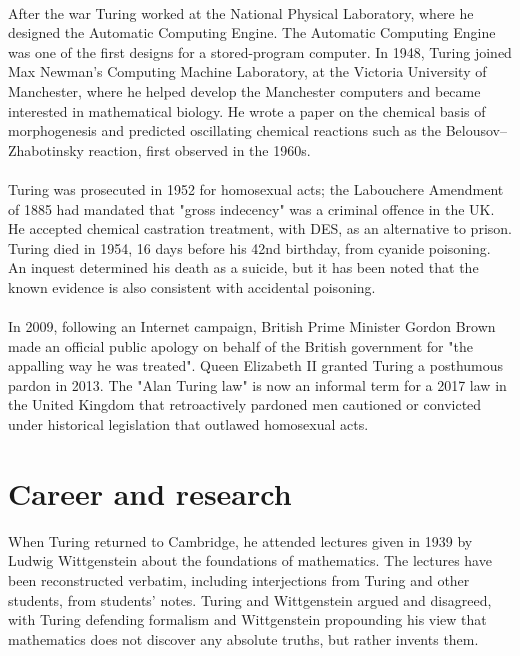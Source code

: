 \documentclass{article}
\begin{document}
\\
After the war Turing worked at the National Physical Laboratory, where he designed the Automatic Computing Engine. The Automatic Computing Engine was one of the first designs for a stored-program computer. In 1948, Turing joined Max Newman's Computing Machine Laboratory, at the Victoria University of Manchester, where he helped develop the Manchester computers and became interested in mathematical biology. He wrote a paper on the chemical basis of morphogenesis and predicted oscillating chemical reactions such as the Belousov–Zhabotinsky reaction, first observed in the 1960s.\\
\\
Turing was prosecuted in 1952 for homosexual acts; the Labouchere Amendment of 1885 had mandated that "gross indecency" was a criminal offence in the UK. He accepted chemical castration treatment, with DES, as an alternative to prison. Turing died in 1954, 16 days before his 42nd birthday, from cyanide poisoning. An inquest determined his death as a suicide, but it has been noted that the known evidence is also consistent with accidental poisoning.\\
\\
In 2009, following an Internet campaign, British Prime Minister Gordon Brown made an official public apology on behalf of the British government for "the appalling way he was treated". Queen Elizabeth II granted Turing a posthumous pardon in 2013. The "Alan Turing law" is now an informal term for a 2017 law in the United Kingdom that retroactively pardoned men cautioned or convicted under historical legislation that outlawed homosexual acts.\\
\section{Career and research}

When Turing returned to Cambridge, he attended lectures given in 1939 by Ludwig Wittgenstein about the foundations of mathematics. The lectures have been reconstructed verbatim, including interjections from Turing and other students, from students' notes. Turing and Wittgenstein argued and disagreed, with Turing defending formalism and Wittgenstein propounding his view that mathematics does not discover any absolute truths, but rather invents them.\\
\end{document}
